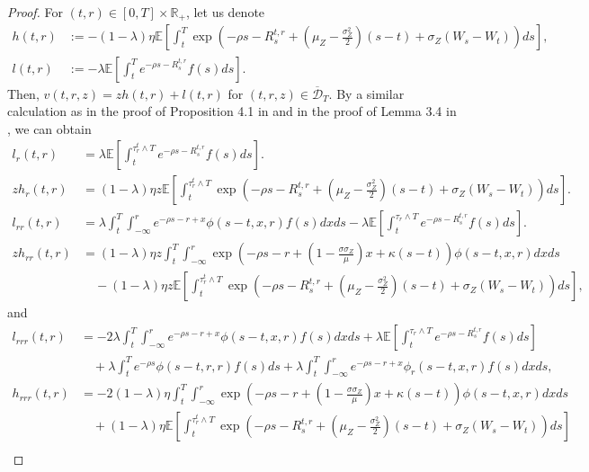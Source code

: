 \documentclass[11pt,times,letter]{article}
\newcommand{\Ex}{ \mathbb{E} }
\newcommand{\R}{\mathds{R}}
\numberwithin{equation}{section}
\begin{document}
\begin{proof}
For $(t,r)\in [0,T]\times \R_+$, let us denote 
\begin{align}
h(t,r)&:=-(1-\lambda)\eta \Ex\left[ \int_t^T\exp\left(-\rho s-R^{t,r}_s+\left(\mu_Z-\frac{\sigma_Z^2}{2}\right)(s-t)+\sigma_Z(W_s-W_t)\right) ds\right],\label{eq:h}\\
l(t,r)&:=-\lambda\Ex\left[ \int_t^Te^{-\rho s-R^{t,r}_s}f(s) ds\right].\label{eq:l}
\end{align}
Then, $v(t,r,z)=zh(t,r)+l(t,r)$ for $(t,r,z)\in \overline{\mathcal{D}}_T$. By a similar calculation as in the proof of Proposition  4.1 in \cite{BoLiaoYu21} and in the proof of Lemma 3.4 in \cite{BHY24a}, we can obtain 
\begin{align}
l_r(t, r)&=\lambda\mathbb{E}\left[\int_t^{\tau_r^t \wedge T} e^{-\rho s-R_s^{t, r}} f(s)ds\right].\label{eq:l-r-1}\\
zh_r(t, r)&=(1-\lambda)\eta z\Ex\left[ \int_t^{\tau_r^t \wedge T}\exp\left(-\rho s-R^{t,r}_s+\left(\mu_Z-\frac{\sigma_Z^2}{2}\right)(s-t)+\sigma_Z(W_s-W_t)\right) ds\right].\nonumber\\
l_{rr}(t,r)&=\lambda  \int_{t}^{T}\int_{-\infty}^{r} e^{-\rho s-r+x}\phi(s-t,x,r)f(s)dx ds-\lambda  \Ex\left[\int_{t}^{\tau_r\wedge T} e^{-\rho s-R_s^{t,r}}f(s)ds\right].\label{eq:l-r-2}\\
zh_{rr}(t,r)&=(1-\lambda)\eta z\int_{t}^{T}\int_{-\infty}^{r} \exp\left(-\rho s-r+\left(1-\frac{\sigma\sigma_Z}{\mu}\right)x+\kappa(s-t)\right) \phi(s-t,x,r)dx ds\nonumber\\
&\quad-(1-\lambda)\eta z \Ex\left[ \int_t^{\tau_r^t \wedge T}\exp\left(-\rho s-R^{t,r}_s+\left(\mu_Z-\frac{\sigma_Z^2}{2}\right)(s-t)+\sigma_Z(W_s-W_t)\right) ds\right],\nonumber
\end{align}
and 
\begin{align}
l_{rrr}(t,r)&=-2\lambda  \int_{t}^{T}\int_{-\infty}^{r} e^{-\rho s-r+x}\phi(s-t,x,r)f(s)dx ds+\lambda  \Ex\left[\int_{t}^{\tau_r\wedge T} e^{-\rho s-R_s^{t,r}}f(s)ds\right]\nonumber\\
&\quad+\lambda  \int_{t}^{T} e^{-\rho s}\phi(s-t,r,r)f(s) ds+\lambda  \int_{t}^{T}\int_{-\infty}^{r} e^{-\rho s-r+x}\phi_r(s-t,x,r)f(s)dx ds,\label{eq:l-r-3}\\
h_{rrr}(t,r)&=-2(1-\lambda)\eta\int_{t}^{T}\int_{-\infty}^{r} \exp\left(-\rho s-r+\left(1-\frac{\sigma\sigma_Z}{\mu}\right)x+\kappa(s-t)\right) \phi(s-t,x,r)dx ds\nonumber\\
&\quad+(1-\lambda)\eta \Ex\left[ \int_t^{\tau_r^t \wedge T}\exp\left(-\rho s-R^{t,r}_s+\left(\mu_Z-\frac{\sigma_Z^2}{2}\right)(s-t)+\sigma_Z(W_s-W_t)\right) ds\right]\nonumber\\

\end{align}
\end{proof}
\end{document}
